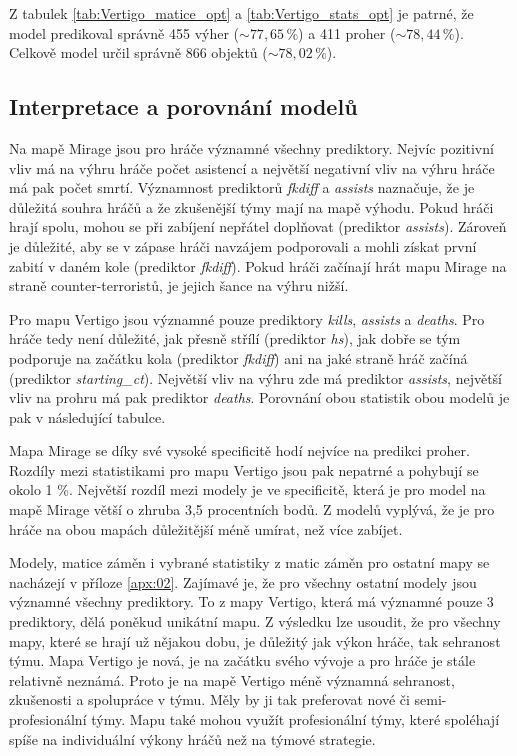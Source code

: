 

Z tabulek \ref{tab:Vertigo_matice_opt} a \ref{tab:Vertigo_stats_opt} je patrné, že model predikoval správně 455 výher ($\sim 77,65 \,\% $) a 411 proher ($\sim 78,44 \,\% $).
Celkově model určil správně 866 objektů ($\sim 78,02 \,\% $).

\subsection{Interpretace a porovnání modelů}
Na mapě Mirage jsou pro hráče významné všechny prediktory. Nejvíc pozitivní vliv má na výhru hráče počet asistencí a největší negativní vliv
na výhru hráče má pak počet smrtí. Významnost prediktorů \textit{fkdiff} a \textit{assists} naznačuje, že je důležitá souhra hráčů a že zkušenější týmy
mají na mapě výhodu. Pokud hráči hrají spolu, mohou se při zabíjení nepřátel doplňovat (prediktor \textit{assists}). Zároveň je důležité, aby se v zápase
hráči navzájem podporovali a mohli získat první zabití v daném kole (prediktor \textit{fkdiff}). Pokud hráči začínají hrát mapu Mirage na straně counter-terroristů,
je jejich šance na výhru nižší.

Pro mapu Vertigo jsou  významné pouze prediktory \textit{kills}, \textit{assists} a \textit{deaths}. Pro hráče tedy není důležité, jak přesně
střílí (prediktor \textit{hs}), jak dobře se tým podporuje na začátku kola (prediktor \textit{fkdiff}) ani na jaké straně hráč začíná (prediktor \textit{starting\_ct}).
Největší vliv na výhru zde má prediktor \textit{assists}, největší vliv na prohru má pak prediktor \textit{deaths}. Porovnání obou statistik obou modelů je pak
v následující tabulce.



Mapa Mirage se  díky své vysoké specificitě hodí nejvíce na predikci proher. Rozdíly mezi statistikami pro mapu Vertigo jsou pak nepatrné a pohybují se okolo 1 \%.
Největší rozdíl mezi modely je ve specificitě, která je pro model na mapě Mirage větší o zhruba 3,5 procentních bodů. Z modelů vyplývá, že je pro hráče na obou
mapách důležitější méně umírat, než více zabíjet.

Modely, matice záměn i vybrané statistiky z matic záměn pro ostatní mapy se nacházejí v příloze \ref{apx:02}. Zajímavé je, že pro všechny ostatní modely
jsou významné všechny prediktory. To z mapy Vertigo, která má významné pouze 3 prediktory, dělá poněkud unikátní mapu. Z výsledku lze usoudit, že
pro všechny mapy, které se hrají už nějakou dobu, je důležitý jak výkon hráče, tak sehranost týmu. Mapa Vertigo je nová, je na začátku svého
vývoje a pro hráče je stále relativně neznámá. Proto je na mapě Vertigo méně významná sehranost, zkušenosti a spolupráce v týmu. Měly by ji tak preferovat
nové či semi-profesionální týmy. Mapu také mohou využít profesionální týmy, které spoléhají spíše na individuální výkony hráčů než na týmové strategie.

